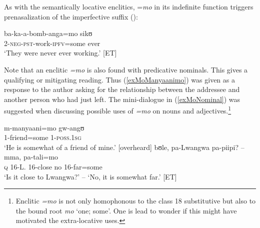 As with the semantically locative enclitics, =\textit{mo} in its indefinite function triggers prenasalization of the imperfective suffix ():
\begin{exe}
	\ex \gll ba-ka-a-bomb-anga=mo sikʊ\\
	2-\textsc{neg}-\textsc{pst}-work-\textsc{ipfv}=some ever\\
	\glt `They were never ever working.' [ET]
\end{exe}

Note that an enclitic \textit{=mo} is also found with predicative nominals. This gives a qualifying or mitigating reading. Thus (\ref{exMoManyaanimo}) was given as a response to the author asking for the relationship between the addressee and another person who had just left. The mini-dialogue in (\ref{exMoNominal}) was suggested when discussing possible uses of \textit{=mo} on nouns and adjectives.\footnote{Enclitic \textit{=mo} is not only homophonous to the  class 18 substitutive but also to the bound root \textit{mo} `one; some'. One is lead to wonder if this might have motivated the extra-locative uses.}
\begin{exe}
	\ex\label{exMoManyaanimo}\gll m-manyaani=mo gw-angʊ\\
	1-friend=some 1-\textsc{poss.1sg}\\
	\glt `He is somewhat of a friend of mine.' [overheard]
	\ex\label{exMoNominal}
	\gll bʊle, pa-Lwangwa pa-piipi? -- mma, pa-tali=mo\\
	\textsc{q} 16-L. 16-close {} no 16-far=some\\
	\glt `Is it close to Lwangwa?' -- \lq No, it is somewhat far.' [ET]
\end{exe}
